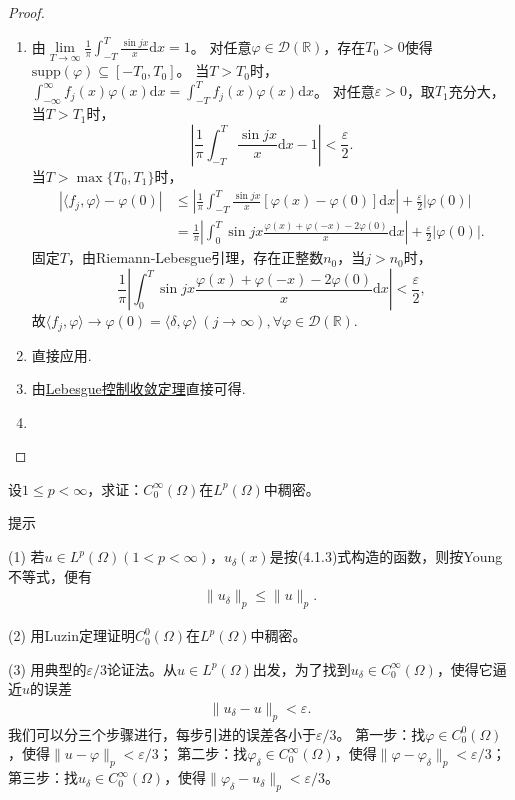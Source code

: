 \documentclass[../../main.tex]{subfiles}%
\begin{document}
\begin{proof}
\begin{enumerate}[(1)]
\item 由$\lim\limits_{T\to\infty}\frac{1}{\pi}\int_{-T}^T\frac{\sin jx}{x}\mathrm{d}x=1$。
对任意$\varphi\in\mathscr{D}(\mathbb{R})$，存在$T_0>0$使得$\mathrm{supp}(\varphi)\subseteq[-T_0,T_0]$。
当$T>T_0$时，$\int_{-\infty}^\infty f_j(x)\varphi(x)\mathrm{d}x=\int_{-T}^T f_j(x)\varphi(x)\mathrm{d}x$。
对任意$\varepsilon>0$，取$T_1$充分大，当$T>T_1$时，
$$\left|\frac{1}{\pi}\int_{-T}^T\frac{\sin jx}{x}\mathrm{d}x-1\right|<\frac{\varepsilon}{2}.$$
当$T>\max\{T_0,T_1\}$时，
\begin{align*}
|\langle f_j,\varphi\rangle-\varphi(0)|&\leqslant\left|\frac{1}{\pi}\int_{-T}^T\frac{\sin jx}{x}[\varphi(x)-\varphi(0)]\mathrm{d}x\right|+\frac{\varepsilon}{2}|\varphi(0)|\\
&=\frac{1}{\pi}\left|\int_{0}^T\sin jx\frac{\varphi(x)+\varphi(-x)-2\varphi(0)}{x}\mathrm{d}x\right|+\frac{\varepsilon}{2}|\varphi(0)|.
\end{align*}
固定$T$，由Riemann-Lebesgue引理，存在正整数$n_0$，当$j>n_0$时，
$$\frac{1}{\pi}\left|\int_{0}^T\sin jx\frac{\varphi(x)+\varphi(-x)-2\varphi(0)}{x}\mathrm{d}x\right|<\frac{\varepsilon}{2},$$
故$\langle f_j,\varphi\rangle\to\varphi(0)=\langle\delta,\varphi\rangle\ (j\to\infty),\forall\varphi\in\mathscr{D}(\mathbb{R})$.

\item 直接应用.

\item 由\hyperref[Real-Analysis-theorem:控制收敛定理]{Lebesgue控制收敛定理}直接可得.

\item 
\end{enumerate}
\end{proof}

\begin{example}
设$1\leqslant p<\infty$，求证：$C_0^\infty(\Omega)$在$L^p(\Omega)$中稠密。
\end{example}
\begin{note}
提示

(1) 若$u\in L^p(\Omega)(1<p<\infty)$，$u_\delta(x)$是按(4.1.3)式构造的函数，则按Young不等式，便有
\begin{align*}
\|u_\delta\|_p \leqslant \|u\|_p.
\end{align*}

(2) 用Luzin定理证明$C_0^0(\Omega)$在$L^p(\Omega)$中稠密。

(3) 用典型的$\varepsilon/3$论证法。从$u\in L^p(\Omega)$出发，为了找到$u_\delta\in C_0^\infty(\Omega)$，使得它逼近$u$的误差
\begin{align*}
\|u_\delta - u\|_p < \varepsilon.
\end{align*}
我们可以分三个步骤进行，每步引进的误差各小于$\varepsilon/3$。
第一步：找$\varphi\in C_0^0(\Omega)$，使得$\|u - \varphi\|_p < \varepsilon/3$；
第二步：找$\varphi_\delta\in C_0^\infty(\Omega)$，使得$\|\varphi - \varphi_\delta\|_p < \varepsilon/3$；
第三步：找$u_\delta\in C_0^\infty(\Omega)$，使得$\|\varphi_\delta - u_\delta\|_p < \varepsilon/3$。
\end{note}
\end{document}

